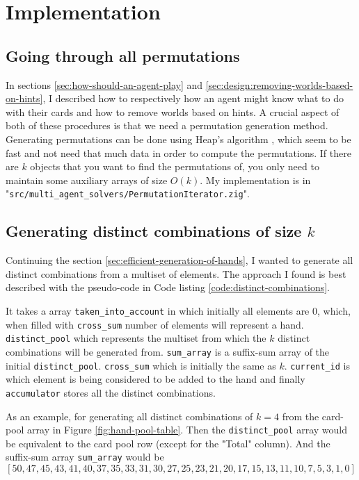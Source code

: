 \section{Implementation}

\subsection{Going through all permutations}
In sections \ref{sec:how-should-an-agent-play} and \ref{sec:design:removing-worlds-based-on-hints}, I described how to respectively how an agent might know what to do with their cards and how to remove worlds based on hints.
A crucial aspect of both of these procedures is that we need a permutation generation method.
Generating permutations can be done using Heap's algorithm \cite{wiki:heapsalgorithm}, which seem to be fast and not need that much data in order to compute the permutations.
If there are $k$ objects that you want to find the permutations of, you only need to maintain some auxiliary arrays of size $O(k)$.
My implementation is in "{\tt src/multi\_agent\_solvers/PermutationIterator.zig}". 


\subsection{Generating distinct combinations of size $k$} \label{implementation:sec:generating-distinct-combinations}
Continuing the section \ref{sec:efficient-generation-of-hands}, I wanted to generate all distinct combinations from a multiset of elements.
The approach I found is best described with the pseudo-code in Code listing \ref{code:distinct-combinations}. 

It takes a array {\tt  taken\_into\_account} in which initially all elements are 0, which, when filled with {\tt cross\_sum} number of elements will represent a hand.
{\tt distinct\_pool} which represents the multiset from which the $k$ distinct combinations will be generated from.
{\tt sum\_array} is a suffix-sum array of the initial {\tt distinct\_pool}.
{\tt cross\_sum} which is initially the same as $k$.
{\tt current\_id} is which element is being considered to be added to the hand and finally {\tt accumulator} stores all the distinct combinations.

As an example, for generating all distinct combinations of $k=4$ from the card-pool array in Figure \ref{fig:hand-pool-table}.
Then the {\tt distinct\_pool} array would be equivalent to the card pool row (except for the "Total" column).
And the suffix-sum array {\tt sum\_array} would be
\[
[50, 47, 45, 43, 41, 40, 37, 35, 33, 31, 30, 27, 25, 23, 21, 20, 17, 15, 13, 11, 10, 7, 5, 3, 1, 0]
\]

